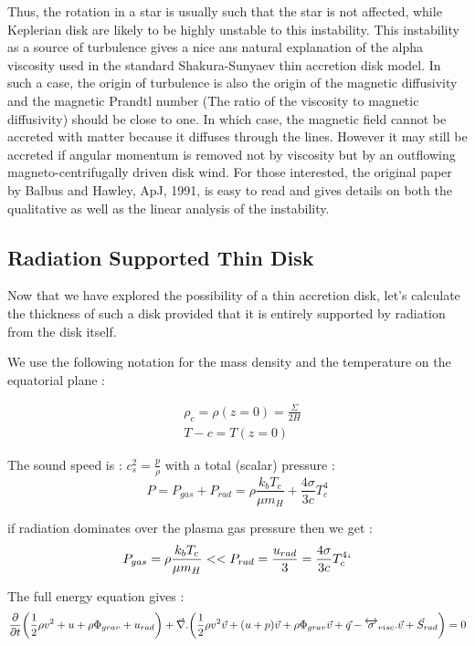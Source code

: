 \documentclass[10pt,a4paper,english]{article}
\begin{document}
Thus, the rotation in a star is usually such that the star is not affected, while Keplerian
disk are likely to be highly unstable  to this instability. This instability as a source of
turbulence gives a  nice ans natural explanation of the alpha viscosity  used in the standard
Shakura-Sunyaev thin accretion disk model. In such a case,  the origin of turbulence is also
the origin of the magnetic diffusivity and the magnetic Prandtl number (The ratio of the viscosity to magnetic
diffusivity) should be close to one. In which case, the magnetic field cannot be accreted with matter because it
diffuses through the lines. However it may still be accreted if angular momentum is removed not by viscosity
but by an outflowing  magneto-centrifugally driven disk wind. For those interested, the original paper by Balbus
and Hawley, ApJ, 1991, is easy to read and gives details on both the qualitative as well as the linear
analysis of the instability.


\subsection{Radiation Supported Thin Disk}

Now that we have explored the possibility of a thin accretion disk, let's calculate the thickness
of such a disk provided that it is entirely supported by radiation from the disk itself.

We use the following notation for the mass density and the temperature on the equatorial  plane :

\begin{align}
    & \rho_c = \rho(z=0) = \frac{\Sigma}{2H} \\
       & T-c = T(z=0)
\end{align}

The sound speed is : $c_s^2 = \frac{p}{\rho}$ with a total (scalar) pressure :
\begin{equation}
    P = P_{gas} + P_{rad}  = \rho \frac{k_b T_c}{\mu m_H} + \frac{4\sigma}{3 c}T_c^4
\end{equation}

if radiation dominates over the plasma gas pressure then we get :
\begin{equation}
    P_{gas} = \rho \frac{k_b T_c}{\mu m_H} << P_{rad} = \frac{u_{rad}}{3} = \frac{4\sigma}{3 c}T_c^4`
\end{equation}

The full energy equation gives :
\begin{equation}
    \frac{\partial}{\partial t } \bigg (
    \frac{1}{2}\rho v^2 + u + \rho \Phi_{grav} + u_{rad} \bigg) +
    \vec{\nabla}.\bigg(
    \frac{1}{2}\rho v^2 \vec{v} + (u + p)\vec{v} + \rho \Phi_{grav}\vec{v} +
    \vec{q} - \overleftrightarrow{\sigma}_{visc}.\vec{v} + \vec{S}_{rad}
    \bigg) = 0
\end{equation}
\end{document}
